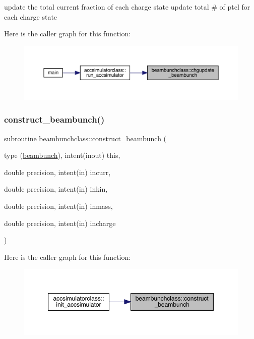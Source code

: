 update the total current fraction of each charge state update total \# of ptcl for each charge state 

Here is the caller graph for this function\+:\nopagebreak
\begin{figure}[H]
\begin{center}
\leavevmode
\includegraphics[width=350pt]{namespacebeambunchclass_ac5b1c15c02703f7339b67283bc9816bd_icgraph}
\end{center}
\end{figure}
\mbox{\label{namespacebeambunchclass_a1605e527eb41043dc5962da1e3bb5159}} 
\subsubsection{\texorpdfstring{construct\_beambunch()}{construct\_beambunch()}}
{\footnotesize\ttfamily subroutine beambunchclass\+::construct\+\_\+beambunch (\begin{DoxyParamCaption}\item[{type (\mbox{\hyperlink{namespacebeambunchclass_structbeambunchclass_1_1beambunch}{beambunch}}), intent(inout)}]{this,  }\item[{double precision, intent(in)}]{incurr,  }\item[{double precision, intent(in)}]{inkin,  }\item[{double precision, intent(in)}]{inmass,  }\item[{double precision, intent(in)}]{incharge }\end{DoxyParamCaption})}

Here is the caller graph for this function\+:\nopagebreak
\begin{figure}[H]
\begin{center}
\leavevmode
\includegraphics[width=350pt]{namespacebeambunchclass_a1605e527eb41043dc5962da1e3bb5159_icgraph}
\end{center}
\end{figure}
\mbox{\label{namespacebeambunchclass_ad456951b863b3dfab6eb7fa018e17230}} 
